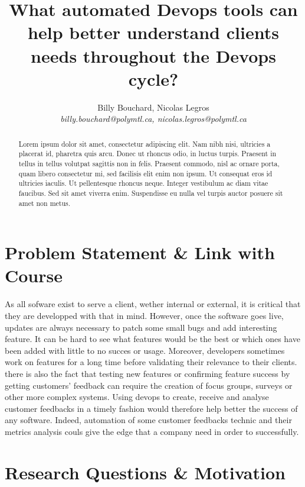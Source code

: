 \documentclass[10pt, conference]{IEEEtran}
\title{What automated Devops tools can help better understand clients needs 
  throughout the Devops cycle?}
\author{Billy Bouchard, Nicolas Legros    \\
    \emph{billy.bouchard@polymtl.ca, nicolas.legros@polymtl.ca}}
\begin{document}
\maketitle

\begin{abstract}
Lorem ipsum dolor sit amet, consectetur adipiscing elit. Nam nibh nisi, ultricies a placerat id, pharetra quis arcu. Donec ut rhoncus odio, in luctus turpis. Praesent in tellus in tellus volutpat sagittis non in felis. Praesent commodo, nisl ac ornare porta, quam libero consectetur mi, sed facilisis elit enim non ipsum. Ut consequat eros id ultricies iaculis. Ut pellentesque rhoncus neque. Integer vestibulum ac diam vitae faucibus. Sed sit amet viverra enim. Suspendisse eu nulla vel turpis auctor posuere sit amet non metus.
\end{abstract}

\section{Problem Statement \& Link with Course}
\label{sec:statement}

As all sofware exist to serve a client, wether internal or external, it is critical that they are developped with that in mind.
However, once the software goes live, updates are always necessary to patch some small bugs and add interesting feature.
It can be hard to see what features would be the best or which ones have been added with little to no succes or usage.
Moreover, developers sometimes work on features for a long time before validating their relevance to their clients. 
there is also the fact that testing new features or confirming feature success by getting customers' feedback can require the creation of focus groups, surveys or other more complex systems.
Using devops to create, receive and analyse customer feedbacks in a timely fashion would therefore help better the success of any software.
Indeed, automation of some customer feedbacks technic and their metrics analysis couls give the edge that a company need in order to successfully.

\section{Research Questions \& Motivation}
\label{sec:research-idea}
\end{document}
